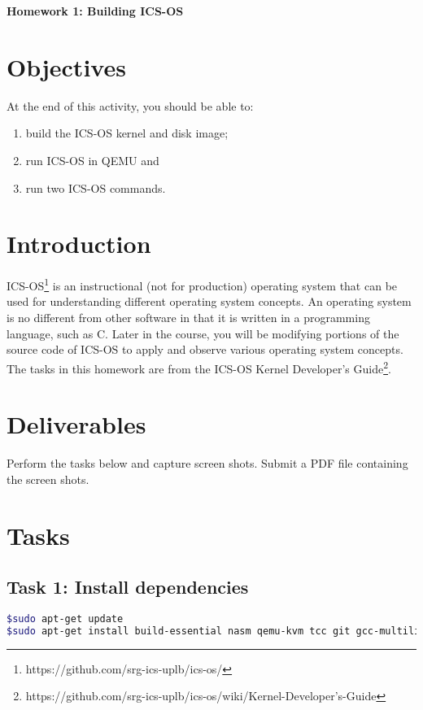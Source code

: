\documentclass[a4paper, 11pt,oneside]{article}
\begin{document}
\begin{center}
	{\LARGE \textbf{Homework 1: Building ICS-OS}}
\end{center}

\section*{Objectives}
   At the end of this activity, you should be able to:
   \begin{enumerate}
       \item build the ICS-OS kernel and disk image;
       \item run ICS-OS in QEMU and
       \item run two ICS-OS commands.
   \end{enumerate}   

\section{Introduction}
ICS-OS\footnote{https://github.com/srg-ics-uplb/ics-os/} is an instructional (not for production) operating system that can be used for understanding different operating system concepts. An 
operating system is no different from other software in that it is written in a programming language,  
such as C. Later in the course, you will be modifying portions of the source code of ICS-OS to 
apply and observe various operating system concepts. The tasks  in this homework are from the ICS-OS Kernel Developer's Guide\footnote{https://github.com/srg-ics-uplb/ics-os/wiki/Kernel-Developer's-Guide}.


\section{Deliverables}
Perform the tasks below and capture screen shots. Submit a PDF file 
containing the screen shots. 


\section{Tasks}

\subsection*{Task 1: Install dependencies}
\begin{lstlisting}[language=bash,frame=single]
$sudo apt-get update
$sudo apt-get install build-essential nasm qemu-kvm tcc git gcc-multilib
\end{lstlisting}
\end{document}
